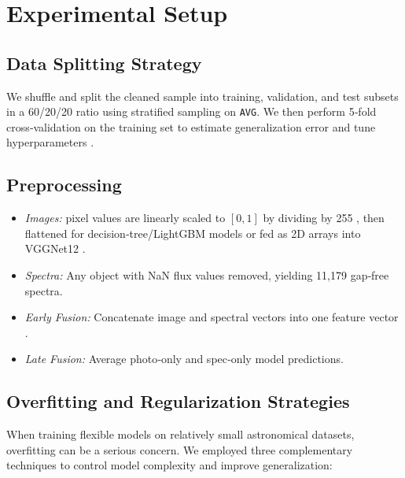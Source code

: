 \documentclass[english,bachelor,oneside]{ctufit-thesis}
\begin{document}
\section{Experimental Setup}

\subsection{Data Splitting Strategy}
We shuffle and split the cleaned sample into training, validation, and test subsets in a 60/20/20 ratio using stratified sampling on \texttt{AVG}. We then perform 5‐fold cross‐validation on the training set to estimate generalization error and tune hyperparameters \cite{Kohavi1995,Pedregosa2011}.

\subsection{Preprocessing}
\begin{itemize}
  \item \textit{Images:} pixel values are linearly scaled to $[0,1]$ by dividing by 255 \cite{krizhevsky2012imagenet}, then flattened for decision‐tree/LightGBM models or fed as 2D arrays into VGGNet12 \cite{pedregosa2011scikit}.
  \item \textit{Spectra:} Any object with NaN flux values removed, yielding 11,179 gap‐free spectra\cite{ivezic2020statistics}.
  \item \textit{Early Fusion:} Concatenate image and spectral vectors into one feature vector \cite{dietterich2000ensemble}.
  \item \textit{Late Fusion:} Average photo‐only and spec‐only model predictions\cite{dietterich2000ensemble}.
\end{itemize}

\subsection{Overfitting and Regularization Strategies}
When training flexible models on relatively small astronomical datasets, overfitting can be a serious concern. We employed three complementary techniques to control model complexity and improve generalization:
\end{document}
